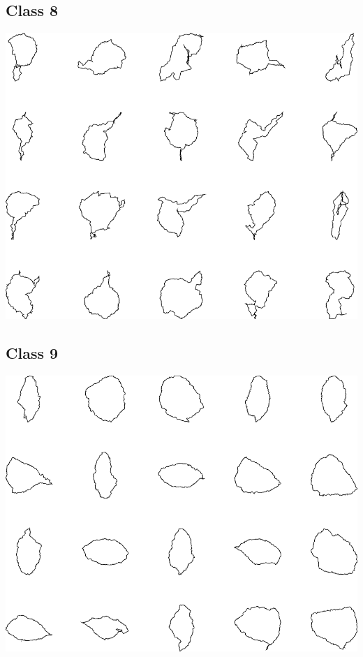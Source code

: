 \documentclass{book}
\begin{document}
\subsection{Class 8}
\includegraphics[width=6in]{output/3.learning/scaled_nts/scaled_nts_8.png}
\subsection{Class 9}
\includegraphics[width=6in]{output/3.learning/scaled_nts/scaled_nts_9.png}
\end{document}
